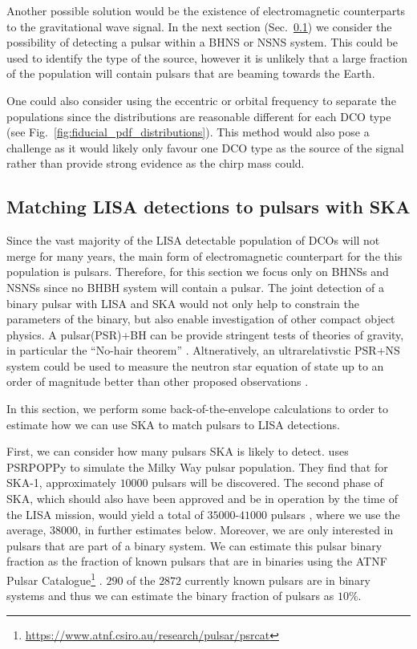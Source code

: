 Another possible solution would be the existence of electromagnetic counterparts to the gravitational wave signal. In the next section (Sec.~\ref{sec:pulsar_matching}) we consider the possibility of detecting a pulsar within a BHNS or NSNS system. This could be used to identify the type of the source, however it is unlikely that a large fraction of the population will contain pulsars that are beaming towards the Earth.

One could also consider using the eccentric or orbital frequency to separate the populations since the distributions are reasonable different for each DCO type (see Fig.~\ref{fig:fiducial_pdf_distributions}). This method would also pose a challenge as it would likely only favour one DCO type as the source of the signal rather than provide strong evidence as the chirp mass could.

\subsection{Matching LISA detections to pulsars with SKA}\label{sec:pulsar_matching}
Since the vast majority of the LISA detectable population of DCOs will not merge for many years, the main form of electromagnetic counterpart for the this population is pulsars. Therefore, for this section we focus only on BHNSs and NSNSs since no BHBH system will contain a pulsar. The joint detection of a binary pulsar with LISA and SKA would not only help to constrain the parameters of the binary, but also enable investigation of other compact object physics. A pulsar(PSR)+BH can be provide stringent tests of theories of gravity, in particular the ``No-hair theorem'' \citep{Keane+2015}. Altneratively, an ultrarelativstic PSR+NS system could be used to measure the neutron star equation of state up to an order of magnitude better than other proposed observations \citep{Kyutoku+2019, Thrane+2020}.

In this section, we perform some back-of-the-envelope calculations to order to estimate how we can use SKA to match pulsars to LISA detections.

First, we can consider how many pulsars SKA is likely to detect. \citet{Keane+2015} uses PSRPOPPy \citep{Bates+2014} to simulate the Milky Way pulsar population. They find that for SKA-1, approximately $10000$ pulsars will be discovered. The second phase of SKA, which should also have been approved and be in operation by the time of the LISA mission, would yield a total of $35000$-$41000$ pulsars \citep{Keane+2015}, where we use the average, $38000$, in further estimates below. Moreover, we are only interested in pulsars that are part of a binary system. We can estimate this pulsar binary fraction as the fraction of known pulsars that are in binaries using the ATNF Pulsar Catalogue\footnote{\url{https://www.atnf.csiro.au/research/pulsar/psrcat}} \citep{Manchester+2005}. $290$ of the $2872$ currently known pulsars are in binary systems and thus we can estimate the binary fraction of pulsars as $10\%$.


